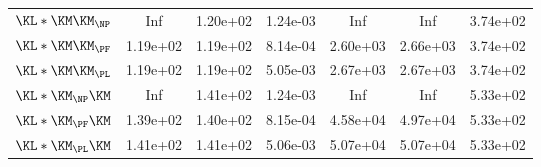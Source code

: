 \begin{tabular}{r|cccccc}
                $\KL*{\KM}{\KM_{\NP}}$ &                           Inf &                    1.20e+02 &                       1.24e-03 &                           Inf &                         Inf &                       3.74e+02 \\
                $\KL*{\KM}{\KM_{\PF}}$ &                      1.19e+02 &                    1.19e+02 &                       8.14e-04 &                      2.60e+03 &                    2.66e+03 &                       3.74e+02 \\
                $\KL*{\KM}{\KM_{\PL}}$ &                      1.19e+02 &                    1.19e+02 &                       5.05e-03 &                      2.67e+03 &                    2.67e+03 &                       3.74e+02 \\
                $\KL*{\KM_{\NP}}{\KM}$ &                           Inf &                    1.41e+02 &                       1.24e-03 &                           Inf &                         Inf &                       5.33e+02 \\
                $\KL*{\KM_{\PF}}{\KM}$ &                      1.39e+02 &                    1.40e+02 &                       8.15e-04 &                      4.58e+04 &                    4.97e+04 &                       5.33e+02 \\
                $\KL*{\KM_{\PL}}{\KM}$ &                      1.41e+02 &                    1.41e+02 &                       5.06e-03 &                      5.07e+04 &                    5.07e+04 &                       5.33e+02 \\
\bottomrule
\end{tabular}